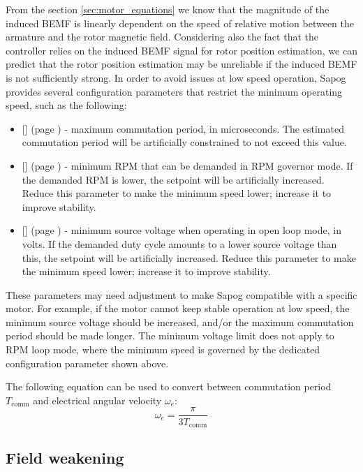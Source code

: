 \documentclass{zubaxdoc}
\newcommand{\CfgRef}[1]{
    \StrSubstitute{#1}{+}{\textunderscore}[\temp]
    \texttt{\temp} {\footnotesize (page \pageref{#1})}
}
\begin{document}
From the section \ref{sec:motor_equations} we know that the magnitude of the induced BEMF is linearly
dependent on the speed of relative motion between the armature and the rotor magnetic field.
Considering also the fact that the controller relies on the induced BEMF signal for rotor position estimation,
we can predict that the rotor position estimation may be unreliable if the induced BEMF is not sufficiently
strong.
In order to avoid issues at low speed operation, Sapog provides several configuration parameters that
restrict the minimum operating speed, such as the following:

\begin{itemize}
\item \CfgRef{mot+comm+per+max} - maximum commutation period, in microseconds.
The estimated commutation period will be artificially constrained to not exceed this value.
\item \CfgRef{mot+rpm+min} - minimum RPM that can be demanded in RPM governor mode.
If the demanded RPM is lower, the setpoint will be artificially increased.
Reduce this parameter to make the minimum speed lower; increase it to improve stability.
\item \CfgRef{mot+v+min} - minimum source voltage when operating in open loop mode, in volts.
If the demanded duty cycle amounts to a lower source voltage than this, the setpoint will be artificially
increased.
Reduce this parameter to make the minimum speed lower; increase it to improve stability.
\end{itemize}

These parameters may need adjustment to make Sapog compatible with a specific motor.
For example, if the motor cannot keep stable operation at low speed,
the minimum source voltage should be increased,
and/or the maximum commutation period should be made longer.
The minimum voltage limit does not apply to RPM loop mode,
where the minimum speed is governed by the dedicated configuration parameter shown above.

The following equation can be used to convert between commutation period $T_\text{comm}$
and electrical angular velocity $\omega_e$:
\begin{equation}
\omega_e = \frac{\pi}{3 T_\text{comm}}
\end{equation}

\subsection{Field weakening}
\end{document}
